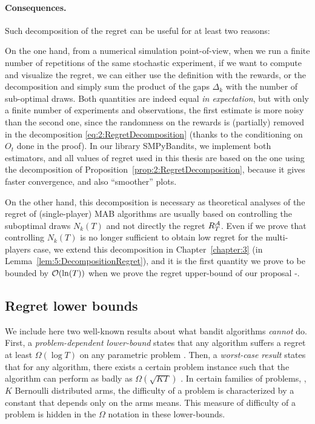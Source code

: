 \paragraph{Consequences.}
%
Such decomposition of the regret can be useful for at least two reasons:

On the one hand, from a numerical simulation point-of-view, when we run a finite number of repetitions of the same stochastic experiment, if we want to compute and visualize the regret, we can either use the definition with the rewards, or the decomposition and simply sum the product of the gaps $\Delta_k$ with the number of sub-optimal draws.
Both quantities are indeed equal \emph{in expectation}, but with only a finite number of experiments and observations, the first estimate is more noisy than the second one, since the randomness on the rewards is (partially) removed in the decomposition \eqref{eq:2:RegretDecomposition} (thanks to the conditioning on $O_t$ done in the proof).
In our library SMPyBandits, we implement both estimators, and all values of regret used in this thesis are based on the one using the decomposition of Proposition~\ref{prop:2:RegretDecomposition}, because it gives faster convergence, and also ``smoother'' plots.
\label{remark:2:moreAccurateCountofRegretForSimulations}

On the other hand, this decomposition is necessary as theoretical analyses of the regret of (single-player) MAB algorithms are usually based on controlling the suboptimal draws $N_k(T)$ and not directly the regret $R_T^{\mathcal{A}}$.
Even if we prove that controlling $N_k(T)$ is no longer sufficient to obtain low regret for the multi-players case, we extend this decomposition in Chapter~\ref{chapter:3} (in Lemma~\ref{lem:5:DecompositionRegret}), and it is the first quantity we prove to be bounded by $\mathop{}\mathopen{}\mathcal{O}\mathopen{}\left(\ln(T)\right)$ when we prove the regret upper-bound of our proposal \MCTopM-\klUCB.


\subsection{Regret lower bounds}

We include here two well-known results about what bandit algorithms \emph{cannot} do.
First, a \emph{problem-dependent lower-bound} states that any algorithm suffers a regret at least $\Omega(\log T)$ on any parametric problem \cite{LaiRobbins85}.
Then, a \emph{worst-case result} states that for any algorithm, there exists a certain problem instance such that the algorithm can perform as badly as $\Omega(\sqrt{K T})$  \cite{Auer02NonStochastic}.
%
In certain families of problems, \eg, $K$ Bernoulli distributed arms, the difficulty of a problem is characterized by a constant that depends only on the arms means. This measure of difficulty of a problem is hidden in the $\Omega$ notation in these lower-bounds.

